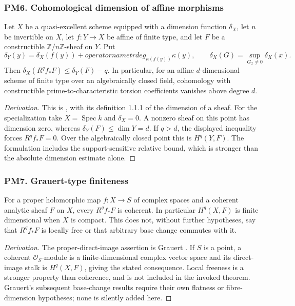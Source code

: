 \subsubsection{PM6. Cohomological dimension of affine morphisms}
\begin{theorem}\label{B:PM6}
Let $X$ be a quasi-excellent scheme equipped with a dimension function $\delta_X$, let $n$ be invertible on $X$, let $f:Y\to X$ be affine of finite type, and let $F$ be a constructible $\mathbb Z/n\mathbb Z$-sheaf on $Y$. Put
\[
 \delta_Y(y)=\delta_X(f(y))+operatorname{trdeg}_{\kappa(f(y))}\kappa(y),
 \qquad
 \delta_X(G)=\sup_{G_{\bar x}\ne0}\delta_X(x).
\]
Then $\delta_X(R^qf_*F)\leq\delta_Y(F)-q$. In particular, for an affine $d$-dimensional scheme of finite type over an algebraically closed field, cohomology with constructible prime-to-characteristic torsion coefficients vanishes above degree $d$.
\end{theorem}
\begin{proof}[Derivation]
This is \cite[Expos\'e XV, Theorem 1.1.2, p.~201]{BILO2014}, with its definition 1.1.1 of the dimension of a sheaf. For the specialization take $X=\operatorname{Spec}k$ and $\delta_X=0$. A nonzero sheaf on this point has dimension zero, whereas $\delta_Y(F)\leq\dim Y=d$. If $q>d$, the displayed inequality forces $R^qf_*F=0$. Over the algebraically closed point this is $H^q(Y,F)$. The formulation includes the support-sensitive relative bound, which is stronger than the absolute dimension estimate alone.
\end{proof}

\subsubsection{PM7. Grauert-type finiteness}
\begin{theorem}\label{B:PM7}
For a proper holomorphic map $f:X\to S$ of complex spaces and a coherent analytic sheaf $F$ on $X$, every $R^qf_*F$ is coherent. In particular $H^q(X,F)$ is finite dimensional when $X$ is compact. This does not, without further hypotheses, say that $R^qf_*F$ is locally free or that arbitrary base change commutes with it.
\end{theorem}
\begin{proof}[Derivation]
The proper-direct-image assertion is Grauert \cite[\S6, Hauptsatz I, p.~59]{BGrauert1960}. If $S$ is a point, a coherent $\mathcal O_S$-module is a finite-dimensional complex vector space and its direct-image stalk is $H^q(X,F)$, giving the stated consequence. Local freeness is a stronger property than coherence, and is not included in the invoked theorem. Grauert's subsequent base-change results require their own flatness or fibre-dimension hypotheses; none is silently added here.
\end{proof}


